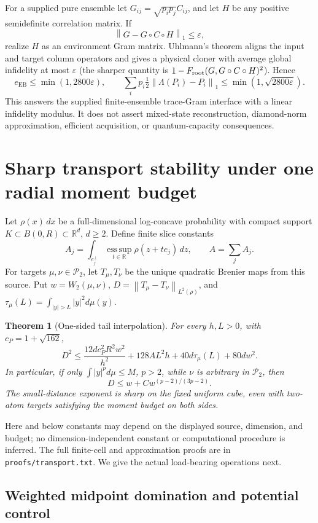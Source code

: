 \documentclass[11pt]{article}
\newtheorem{theorem}{Theorem}
\newcommand{\EB}{\operatorname{EB}}
\newcommand{\norm}[1]{\left\lVert#1\right\rVert}
\begin{document}
For a supplied pure ensemble let $G_{ij}=\sqrt{p_ip_j}C_{ij}$, and let $H$ be any positive semidefinite correlation matrix. If
\[
\norm{G-G\circ C\circ H}_1\le\varepsilon,
\]
realize $H$ as an environment Gram matrix. Uhlmann's theorem aligns the input and target column operators and gives a physical cloner with average global infidelity at most $\varepsilon$ (the sharper quantity is $1-F_{\rm root}(G,G\circ C\circ H)^2$). Hence
\[
e_{\EB}\le\min(1,2800\varepsilon),\qquad
\sum_i p_i\tfrac12\norm{\Lambda(P_i)-P_i}_1
\le\min(1,\sqrt{2800\varepsilon}).\tag{8}
\]
This answers the supplied finite-ensemble trace-Gram interface with a linear infidelity modulus. It does not assert mixed-state reconstruction, diamond-norm approximation, efficient acquisition, or quantum-capacity consequences.

\section{Sharp transport stability under one radial moment budget}

Let $\rho(x)\,dx$ be a full-dimensional log-concave probability with compact support $K\subset B(0,R)\subset\mathbb R^d$, $d\ge2$. Define finite slice constants
\[
A_j=\int_{e_j^\perp}\operatorname*{ess\,sup}_{t\in\mathbb R}\rho(z+te_j)\,dz,
\qquad A=\sum_jA_j.
\]
For targets $\mu,\nu\in\mathcal P_2$, let $T_\mu,T_\nu$ be the unique quadratic Brenier maps from this source. Put $w=W_2(\mu,\nu)$, $D=\norm{T_\mu-T_\nu}_{L^2(\rho)}$, and $\tau_\mu(L)=\int_{|y|>L}|y|^2d\mu(y)$.

\begin{theorem}[One-sided tail interpolation]\label{thm:transport}
For every $h,L>0$, with $c_P=1+\sqrt{162}$,
\[
D^2\le\frac{12d c_P^2R^2w^2}{h^2}
+128AL^2h+40d\tau_\mu(L)+80dw^2.\tag{9}
\]
In particular, if only $\int|y|^p d\mu\le M$, $p>2$, while $\nu$ is arbitrary in $\mathcal P_2$, then
\[
D\le w+Cw^{(p-2)/(3p-2)}.\tag{10}
\]
The small-distance exponent is sharp on the fixed uniform cube, even with two-atom targets satisfying the moment budget on both sides.
\end{theorem}

Here and below constants may depend on the displayed source, dimension, and budget; no dimension-independent constant or computational procedure is inferred. The full finite-cell and approximation proofs are in \texttt{proofs/transport.txt}. We give the actual load-bearing operations next.

\subsection{Weighted midpoint domination and potential control}
\end{document}
